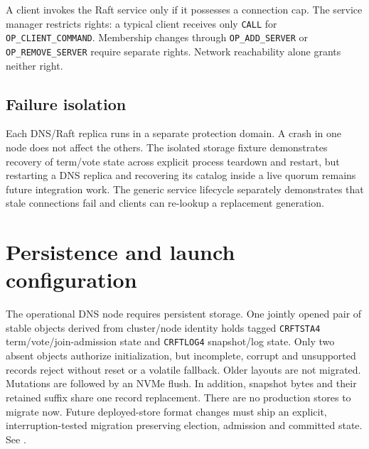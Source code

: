 A client invokes the Raft service only if it possesses a connection cap. The
service manager restricts rights: a typical client receives only
\texttt{CALL} for \texttt{OP\_CLIENT\_COMMAND}. Membership changes through
\texttt{OP\_ADD\_SERVER} or \texttt{OP\_REMOVE\_SERVER} require separate rights.
Network reachability alone grants neither right.

\subsection{Failure isolation}

Each DNS/Raft replica runs in a separate protection domain. A crash in one node
does not affect the others. The isolated storage fixture demonstrates recovery
of term/vote state across explicit process teardown and restart, but restarting a
DNS replica and recovering its catalog inside a live quorum remains future
integration work. The generic service lifecycle separately demonstrates that
stale connections fail and clients can re-lookup a replacement generation.

\section{Persistence and launch configuration}

The operational DNS node requires persistent storage. One jointly opened pair
of stable objects derived from cluster/node identity holds tagged
\texttt{CRFTSTA4} term/vote/join-admission state and \texttt{CRFTLOG4}
snapshot/log state. Only two absent objects authorize initialization, but
incomplete, corrupt and unsupported records reject without reset or a volatile
fallback. Older layouts are not migrated. Mutations are followed by an NVMe
flush. In addition, snapshot bytes and their retained suffix share one record replacement.
There are no production stores to migrate now. Future deployed-store format
changes must ship an explicit, interruption-tested migration preserving
election, admission and committed state. See
.


